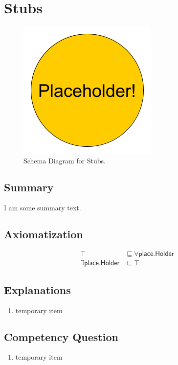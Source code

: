 \section{Stubs}
\label{sec:Stubs}
\begin{figure}[h!]
\begin{center}
\includegraphics[width=.4\textwidth]{figures/placeholder}
\end{center}
\caption{Schema Diagram for Stubs.}
\label{fig:Stubs}
\end{figure}
\subsection{Summary}
\label{sum:Stubs}
I am some summary text.

\subsection{Axiomatization}
\label{axs:Stubs}
\begin{align}
\top &\sqsubseteq \forall\textsf{place.Holder} \\ 
\exists\textsf{place.Holder} &\sqsubseteq \top 
\end{align}

\subsection{Explanations}
\label{exp:Stubs}
\begin{enumerate}
\item temporary item
\end{enumerate}

\subsection{Competency Question}
\label{cqs:Stubs}
\begin{enumerate}[CQ1.]
\item temporary item
\end{enumerate}

\newpage
